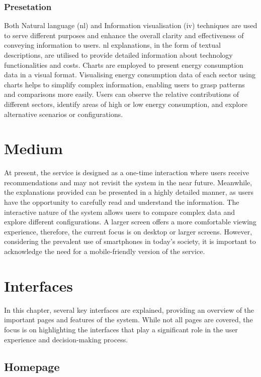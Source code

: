 \subsubsection{Presetation}

Both Natural language (\gls{nl}) and Information visualisation (\gls{iv}) techniques are used to serve different purposes and enhance the overall clarity and effectiveness of conveying information to users. 
\gls{nl} explanations, in the form of textual descriptions, are utilised to provide detailed information about technology functionalities and costs. 
Charts are employed to present energy consumption data in a visual format. 
Visualising energy consumption data of each sector using charts helps to simplify complex information, enabling users to grasp patterns and comparisons more easily. 
Users can observe the relative contributions of different sectors, identify areas of high or low energy consumption, and explore alternative scenarios or configurations. 


\section{Medium}

At present, the service is designed as a one-time interaction where users receive recommendations and may not revisit the system in the near future. 
Meanwhile, the explanations provided can be presented in a highly detailed manner, as users have the opportunity to carefully read and understand the information. 
The interactive nature of the system allows users to compare complex data and explore different configurations. 
A larger screen offers a more comfortable viewing experience, therefore, the current focus is on desktop or larger screens.
However, considering the prevalent use of smartphones in today's society, it is important to acknowledge the need for a mobile-friendly version of the service. 


\section{Interfaces}

In this chapter, several key interfaces are explained, providing an overview of the important pages and features of the system. 
While not all pages are covered, the focus is on highlighting the interfaces that play a significant role in the user experience and decision-making process. 


\subsection*{Homepage}

